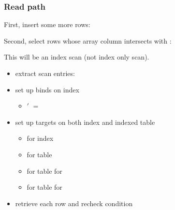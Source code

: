 \begin{frame}
  \frametitle{Read path}
  First, insert some more rows:


  \pause

  Second, select rows whose array column intersects with :


  This will be an index scan (not index only scan).
  \pause

  \begin{itemize}
    \item extract scan entries: 
    \pause
    \item set up binds on index
      \begin{itemize}
        \item {}$'$ $=$ 
      \end{itemize}
    \pause
    \item set up targets on both index and indexed table
      \begin{itemize}
        \item {} for index
        \pause
        \item {} for table
        \pause
        \item {} for table for 
        \pause
        \item {} for table for 
      \end{itemize}
    \pause
    \item retrieve each row and recheck condition
  \end{itemize}
\end{frame}
